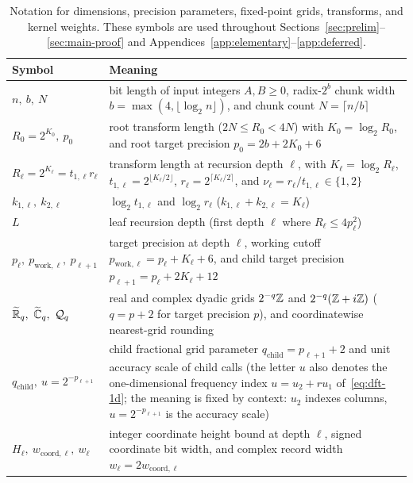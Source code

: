 \begin{table}[!ht]
\centering
\footnotesize
\renewcommand{\arraystretch}{0.96}
\caption{Notation for dimensions, precision parameters, fixed-point grids, transforms, and kernel weights. These symbols are used throughout Sections~\ref{sec:prelim}--\ref{sec:main-proof} and Appendices~\ref{app:elementary}--\ref{app:deferred}.}\label{tab:notation}
\begin{tabular}{@{}>{\raggedright}p{}>{\raggedright\arraybackslash}p{}@{}}
\toprule
Symbol & Meaning \\
\midrule
$n,\ b,\ N$ & bit length of input integers $A, B \ge 0$, radix-$2^b$ chunk width $b = \max(4, \lfloor \log_2 n \rfloor)$, and chunk count $N = \lceil n / b \rceil$ \\
$R_0 = 2^{K_0},\ p_0$ & root transform length ($2N \le R_0 < 4N$) with $K_0 = \log_2 R_0$, and root target precision $p_0 = 2b + 2K_0 + 6$ \\
$R_\ell = 2^{K_\ell} = t_{1,\ell} r_\ell$ & transform length at recursion depth $\ell$, with $K_\ell = \log_2 R_\ell$, $t_{1,\ell} = 2^{\lfloor K_\ell / 2 \rfloor}$, $r_\ell = 2^{\lceil K_\ell / 2 \rceil}$, and $\nu_\ell = r_\ell / t_{1,\ell} \in \{1, 2\}$ \\
$k_{1,\ell},\ k_{2,\ell}$ & $\log_2 t_{1,\ell}$ and $\log_2 r_\ell$ ($k_{1,\ell} + k_{2,\ell} = K_\ell$) \\
$L$ & leaf recursion depth (first depth $\ell$ where $R_\ell \le 4 p_\ell^2$) \\
$p_\ell,\ p_{\mathrm{work},\ell},\ p_{\ell+1}$ & target precision at depth $\ell$, working cutoff $p_{\mathrm{work},\ell} = p_\ell + K_\ell + 6$, and child target precision $p_{\ell+1} = p_\ell + 2K_\ell + 12$ \\
$\Rg_q,\ \Cg_q,\ \Quant_q$ & real and complex dyadic grids $2^{-q}\mathbb{Z}$ and $2^{-q}(\mathbb{Z} + i\mathbb{Z})$ ($q = p + 2$ for target precision $p$), and coordinatewise nearest-grid rounding \\
$q_{\mathrm{child}},\ u = 2^{-p_{\ell+1}}$ & child fractional grid parameter $q_{\mathrm{child}} = p_{\ell+1} + 2$ and unit accuracy scale of child calls (the letter $u$ also denotes the one-dimensional frequency index $u = u_2 + r u_1$ of~\eqref{eq:dft-1d}; the meaning is fixed by context: $u_2$ indexes columns, $u = 2^{-p_{\ell+1}}$ is the accuracy scale) \\
$H_\ell,\ w_{\mathrm{coord},\ell},\ w_\ell$ & integer coordinate height bound at depth $\ell$, signed coordinate bit width, and complex record width $w_\ell = 2 w_{\mathrm{coord},\ell}$ \\

\end{tabular}
\end{table}
